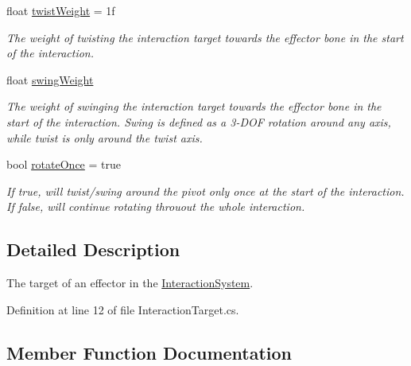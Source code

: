 \begin{DoxyCompactItemize}
float \mbox{\hyperlink{class_root_motion_1_1_final_i_k_1_1_interaction_target_a7e63518b5f31ba27e7356f6f7acc9f88}{twist\+Weight}} = 1f
\begin{DoxyCompactList}\small\item\em The weight of twisting the interaction target towards the effector bone in the start of the interaction. \end{DoxyCompactList}\item 
float \mbox{\hyperlink{class_root_motion_1_1_final_i_k_1_1_interaction_target_a541a52625071374548c87c8d2b6468e2}{swing\+Weight}}
\begin{DoxyCompactList}\small\item\em The weight of swinging the interaction target towards the effector bone in the start of the interaction. Swing is defined as a 3-\/\+D\+OF rotation around any axis, while twist is only around the twist axis. \end{DoxyCompactList}\item 
bool \mbox{\hyperlink{class_root_motion_1_1_final_i_k_1_1_interaction_target_aecda5592f199021ea5741bd870706a4a}{rotate\+Once}} = true
\begin{DoxyCompactList}\small\item\em If true, will twist/swing around the pivot only once at the start of the interaction. If false, will continue rotating throuout the whole interaction. \end{DoxyCompactList}\end{DoxyCompactItemize}


\subsection{Detailed Description}
The target of an effector in the \mbox{\hyperlink{class_root_motion_1_1_final_i_k_1_1_interaction_system}{Interaction\+System}}. 



Definition at line 12 of file Interaction\+Target.\+cs.



\subsection{Member Function Documentation}
\mbox{\label{class_root_motion_1_1_final_i_k_1_1_interaction_target_ab6685ed16287fbda1f35f0a4a656ce45}} 
